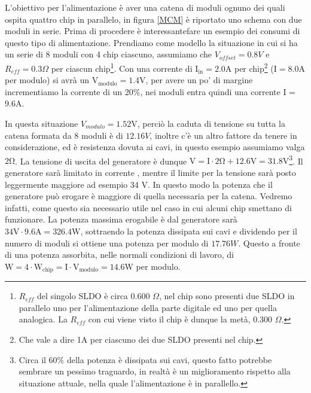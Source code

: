 L'obiettivo per l'alimentazione è aver una catena di moduli ognuno dei quali ospita quattro chip in parallelo, in figura \ref{MCM} è riportato uno schema con due moduli in serie. 
Prima di procedere è interessantefare un esempio dei consumi di questo tipo di alimentazione. Prendiamo come modello la situazione in cui si ha un serie di 8 moduli con 4 chip ciascuno, assumiamo che $V_{offset}=0.8V$ e $R_{eff}=0.3 \Omega$ per ciascun chip\footnote{$R_{eff}$ del singolo SLDO è circa 0.600 $\Omega$, nel chip sono presenti due SLDO in parallelo uno per l'alimentazione della parte digitale ed uno per quella analogica. La $R_{eff}$ con cui viene visto il chip è dunque la metà, 0.300 $\Omega$.}. 
Con una corrente di $\mathrm{I_{in}=2.0 A}$ per chip\footnote{Che vale a dire 1A per ciascuno dei due SLDO presenti nel chip.} ($\mathrm{I=8.0 A}$ per modulo) si avrà un $\mathrm{V_{modulo}=1.4 V}$, per avere un po' di margine incrementiamo la corrente di un 20$\%$, nei moduli entra quindi una corrente I = 9.6A. 

In questa situazione $V_{modulo}=1.52$V, perciò la caduta di tensione su tutta la catena formata da 8 moduli è di  $12.16V$, inoltre c'è un altro fattore da tenere in considerazione, ed è resistenza dovuta ai cavi, in questo esempio assumiamo valga $\mathrm{2 \Omega}$. 
La tensione di uscita del generatore è dunque $\mathrm{V=I \cdot 2 \Omega +12.6V=31.8V}$\footnote{Circa il $60 \%$ della potenza è dissipata sui cavi, questo fatto potrebbe sembrare un pessimo traguardo, in realtà è un miglioramento rispetto alla situazione attuale, nella quale l'alimentazione è in parallello.}. 
Il generatore sarà limitato in corrente , mentre il limite per la tensione sarà posto leggermente maggiore ad esempio 34 V. 
In questo modo la potenza che il generatore può erogare è maggiore di quella necessaria per la catena. Vedremo infatti, come questo sia necessario utile nel caso in cui alcuni chip smettano di funzionare. 
La potenza massima erogabile è dal generatore sarà $\mathrm{34V \cdot 9.6 A = 326.4 W}$, sottraendo la potenza dissipata sui cavi e dividendo per il numero di moduli si ottiene una potenza per modulo di $17.76 W$. Questo a fronte  di una potenza assorbita, nelle normali condizioni di lavoro, di $\mathrm{W = 4 \cdot W_{chip} = I \cdot V_{modulo} = 14.6}$W per modulo.

